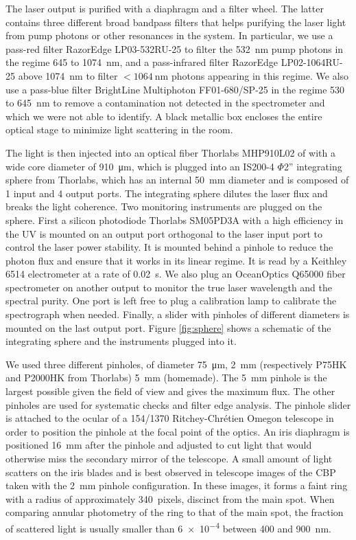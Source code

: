 The laser output is purified with a diaphragm and a filter wheel. The latter contains three different broad bandpass filters that helps purifying the laser light from pump photons or other resonances in the system. In particular, we use a pass-red filter RazorEdge LP03-532RU-25 to filter the \SI{532}{\nano\meter} pump photons in the regime 645 to \SI{1074}{\nano\meter}, and a pass-infrared filter RazorEdge LP02-1064RU-25 above \SI{1074}{\nano\meter} to filter $<\SI{1064}{\nano\meter}$ photons appearing in this regime. We also use a pass-blue filter BrightLine Multiphoton FF01-680/SP-25 in the regime 530 to \SI{645}{\nano\meter} to remove a contamination not detected in the spectrometer and which we were not able to identify. A black metallic box encloses the entire optical stage to minimize light scattering in the room.

The light is then injected into an optical fiber Thorlabs MHP910L02 of with a wide core diameter of \SI{910}{\micro\meter}, which is plugged into an IS200-4 $\Phi$2'' integrating sphere from Thorlabs, which has an internal \SI{50}{\mm} diameter and is composed of 1 input and 4 output ports. The integrating sphere dilutes the laser flux and breaks the light coherence. Two monitoring instruments are plugged on the sphere. First a silicon photodiode Thorlabs SM05PD3A with a high efficiency in the UV is mounted on an output port orthogonal to the laser input port to control the laser power stability. It is mounted behind a pinhole to reduce the photon flux and ensure that it works in its linear regime. It is read by a Keithley 6514 electrometer at a rate of \SI{0.02}{\second}. We also plug an OceanOptics Q65000 fiber spectrometer on another output to monitor the true laser wavelength and the spectral purity. One port is left free to plug a calibration lamp to calibrate the spectrograph when needed. Finally, a slider with pinholes of different diameters is mounted on the last output port. Figure \ref{fig:sphere} shows a schematic of the integrating sphere and the instruments plugged into it.

We used three different pinholes, of diameter \SI{75}{\micro\meter}, \SI{2}{\milli\meter} (respectively P75HK and P2000HK from Thorlabs) \SI{5}{\milli\meter} (homemade). The \SI{5}{\mm} pinhole is the largest possible given the \SD field of view and gives the maximum flux. The other pinholes are used for systematic checks and filter edge analysis. The pinhole slider is attached to the ocular of a 154/1370 Ritchey-Chrétien Omegon telescope in order to position the pinhole at the focal point of the optics. An iris diaphragm is positioned \SI{16}{mm} after the pinhole and adjusted to cut light that would otherwise miss the secondary mirror of the telescope. A small amount of light scatters on the iris blades and is best observed in telescope images of the CBP taken with the \SI{2}{mm} pinhole configuration. In these images, it forms a faint ring with a radius of approximately \SI{340}{pixels}, discinct from the main spot. When comparing annular photometry of the ring to that of the main spot, the fraction of scattered light is usually smaller than \num{6e-4} between 400 and \SI{900}{nm}.

